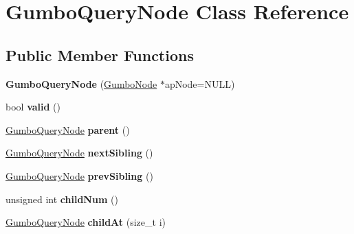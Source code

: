 \hypertarget{class_gumbo_query_node}{}\section{Gumbo\+Query\+Node Class Reference}
\label{class_gumbo_query_node}
\subsection*{Public Member Functions}
\begin{DoxyCompactItemize}
\item 
\mbox{\label{class_gumbo_query_node_a0e1030eb1bfe6d42e04bcb7ca5fa8023}} 
{\bfseries Gumbo\+Query\+Node} (\mbox{\hyperlink{gumbo_8h_a5f67d8397fda8fb7c90cc27f14ac4e7d}{Gumbo\+Node}} $\ast$ap\+Node=N\+U\+LL)
\item 
\mbox{\label{class_gumbo_query_node_a99af01478a14c43388dc405527634322}} 
bool {\bfseries valid} ()
\item 
\mbox{\label{class_gumbo_query_node_a2ac64d7f38382093d09c0d306059cbdb}} 
\mbox{\hyperlink{class_gumbo_query_node}{Gumbo\+Query\+Node}} {\bfseries parent} ()
\item 
\mbox{\label{class_gumbo_query_node_a1e89baa4314bcf225a37b170130ca412}} 
\mbox{\hyperlink{class_gumbo_query_node}{Gumbo\+Query\+Node}} {\bfseries next\+Sibling} ()
\item 
\mbox{\label{class_gumbo_query_node_ac41b2a7bd49a34c9a39cda0ce5d0679d}} 
\mbox{\hyperlink{class_gumbo_query_node}{Gumbo\+Query\+Node}} {\bfseries prev\+Sibling} ()
\item 
\mbox{\label{class_gumbo_query_node_a94c2b01d1a0fc47fc0571827c51ce9d5}} 
unsigned int {\bfseries child\+Num} ()
\item 
\mbox{\label{class_gumbo_query_node_a668ac1c5d84a42cc9da16e6a193855f3}} 
\mbox{\hyperlink{class_gumbo_query_node}{Gumbo\+Query\+Node}} {\bfseries child\+At} (size\+\_\+t i)
\item 
\mbox{\label{class_gumbo_query_node_a1d6de9cceee177de624b75f7254f81b5}} 

\end{DoxyCompactItemize}
